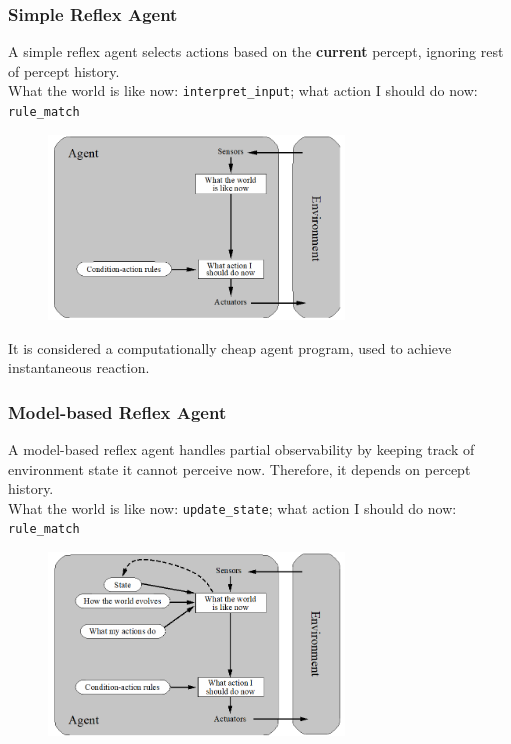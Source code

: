 \documentclass[12pt]{article}
\theoremstyle{definition}
\begin{document}
\subsubsection{Simple Reflex Agent}
A simple reflex agent selects actions based on the \textbf{current} percept, ignoring rest of percept history. \\
What the world is like now: \texttt{interpret\_input}; what action I should do now: \texttt{rule\_match}
\begin{figure}[h]
\centering
\includegraphics[width = 0.7\textwidth]{2_1.png}
\end{figure}
It is considered a computationally cheap agent program, used to achieve instantaneous reaction.
\subsubsection{Model-based Reflex Agent}
A model-based reflex agent handles partial observability by keeping track of environment state it cannot perceive now. Therefore, it depends on percept history.\\
What the world is like now: \texttt{update\_state}; what action I should do now: \texttt{rule\_match}
\begin{figure}[h]
\centering
\includegraphics[width = 0.7\textwidth]{2_2.png}
\end{figure}
\end{document}
